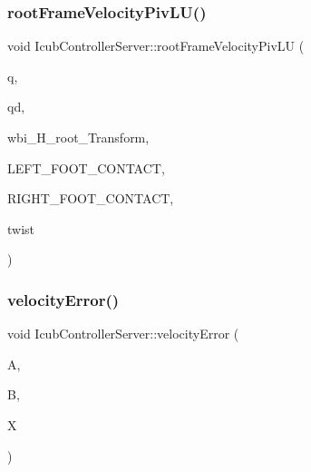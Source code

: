 \hypertarget{classIcubControllerServer_a82650f373c3c2c52a91cc744c67b0dcf}{}\label{classIcubControllerServer_a82650f373c3c2c52a91cc744c67b0dcf} 
\subsubsection{\texorpdfstring{root\+Frame\+Velocity\+Piv\+L\+U()}{rootFrameVelocityPivLU()}\hspace{0.1cm}{\footnotesize\ttfamily [2/2]}}
{\footnotesize\ttfamily void Icub\+Controller\+Server\+::root\+Frame\+Velocity\+Piv\+LU (\begin{DoxyParamCaption}\item[{Eigen\+::\+Vector\+Xd \&}]{q,  }\item[{Eigen\+::\+Vector\+Xd \&}]{qd,  }\item[{i\+Dyn\+Tree\+::\+Transform \&}]{wbi\+\_\+\+H\+\_\+root\+\_\+\+Transform,  }\item[{int}]{L\+E\+F\+T\+\_\+\+F\+O\+O\+T\+\_\+\+C\+O\+N\+T\+A\+CT,  }\item[{int}]{R\+I\+G\+H\+T\+\_\+\+F\+O\+O\+T\+\_\+\+C\+O\+N\+T\+A\+CT,  }\item[{Eigen\+::\+Vector\+Xd \&}]{twist }\end{DoxyParamCaption})}

\hypertarget{classIcubControllerServer_aaedff28c5d9ac9a7cdbc24c9e0cbc5b3}{}\label{classIcubControllerServer_aaedff28c5d9ac9a7cdbc24c9e0cbc5b3} 
\subsubsection{\texorpdfstring{velocity\+Error()}{velocityError()}}
{\footnotesize\ttfamily void Icub\+Controller\+Server\+::velocity\+Error (\begin{DoxyParamCaption}\item[{Eigen\+::\+Matrix\+Xd}]{A,  }\item[{Eigen\+::\+Matrix\+Xd}]{B,  }\item[{Eigen\+::\+Matrix\+Xd}]{X }\end{DoxyParamCaption})}



